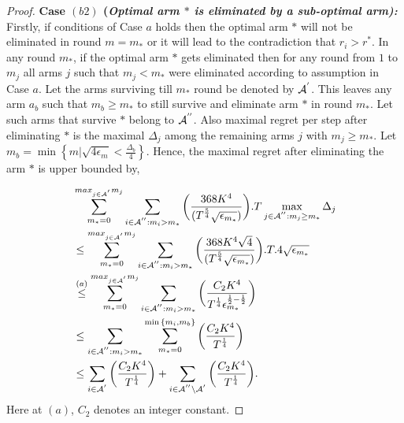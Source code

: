 \begin{proof}
\noindent
\textbf{Case $(b2)$ (\textit{Optimal arm ${*}$ is eliminated by a sub-optimal arm):  }} Firstly, if conditions of Case $a$ holds then the optimal arm ${*}$ will not be eliminated in round $m=m_{*}$ or it will lead to the contradiction that $r_{i}>r^{*}$. In any round $m_{*}$, if the optimal arm ${*}$ gets eliminated then for any round from $1$ to $m_{j}$ all arms ${j}$ such that $m_{j}< m_{*}$ were eliminated according to assumption in Case $a$. Let the arms surviving till $m_{*}$ round be denoted by $\mathcal{A}^{'}$. This leaves any arm $a_{b}$ such that $m_{b}\geq m_{*}$ to still survive and eliminate arm ${*}$ in round $m_{*}$. Let such arms that survive ${*}$ belong to $\mathcal{A}^{''}$. Also maximal regret per step after eliminating ${*}$ is the maximal $\Delta_{j}$ among the remaining arms ${j}$ with $m_{j}\geq m_{*}$.  Let $m_{b}=\min\left\lbrace m|\sqrt{4\epsilon_{m}}<\frac{\Delta_{b}}{4}\right\rbrace$. Hence, the maximal regret after eliminating the arm ${*}$ is upper bounded by, 

\begin{align*}
&\sum_{m_{*}=0}^{max_{j\in \mathcal{A}^{'}}m_{j}}\sum_{i\in \mathcal{A}^{''}:m_{i}>m_{*}}\bigg(\dfrac{368 K^4}{(T^{\frac{5}{4}}\sqrt{\epsilon_{m_{*}}})} \bigg).T\max_{j\in \mathcal{A}^{''}:m_{j}\geq m_{*}}{\Delta}_{j}\\
&\leq\sum_{m_{*}=0}^{max_{j\in \mathcal{A}^{'}}m_{j}}\sum_{i\in \mathcal{A}^{''}:m_{i}>m_{*}}\bigg(\dfrac{368 K^4 \sqrt{4}}{(T^{\frac{5}{4}}\sqrt{\epsilon_{m_{*}}})} \bigg).T.4\sqrt{\epsilon_{m_{*}}}\\
&\overset{(a)}{\leq}\sum_{m_{*}=0}^{max_{j\in \mathcal{A}^{'}}m_{j}}\sum_{i\in \mathcal{A}^{''}:m_{i}>m_{*}}\bigg(\dfrac{C_2 K^4}{T^{\frac{1}{4}}\epsilon_{m_{*}}^{\frac{1}{2}-\frac{1}{2}}} \bigg)\\
&\leq\sum_{i\in \mathcal{A}^{''}:m_{i}>m_{*}}\sum_{m_{*}=0}^{\min{\lbrace m_{i},m_{b}\rbrace}}\bigg(\dfrac{C_2 K^4}{T^{\frac{1}{4}}} \bigg)\\
&\leq\sum_{i\in \mathcal{A}^{'}}\bigg(\dfrac{C_2 K^4}{T^{\frac{1}{4}}} \bigg)+\sum_{i\in \mathcal{A}^{''}\setminus \mathcal{A}^{'}}\bigg(\dfrac{C_2 K^4}{T^{\frac{1}{4}}} \bigg).\\
\end{align*}
Here at $(a)$, $C_2$ denotes an integer constant.



%


\end{proof}
